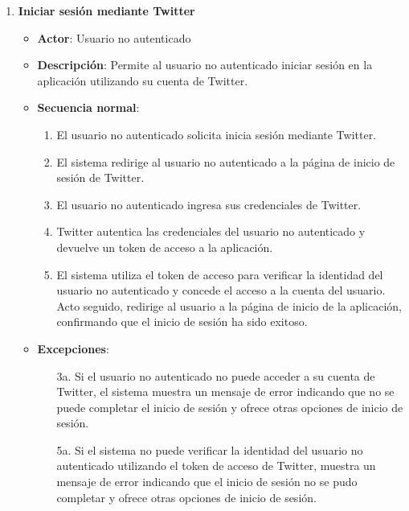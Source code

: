 \begin{enumerate}[label=UC-\protect\twodigits{\arabic*}:, align=left, leftmargin=*]
\item \textbf{Iniciar sesión mediante Twitter}
\begin{itemize}
\item \textbf{Actor}: Usuario no autenticado
\item \textbf{Descripción}: Permite al usuario no autenticado iniciar sesión en la aplicación utilizando su cuenta de Twitter.
\item \textbf{Secuencia normal}:
\begin{enumerate}[label={\arabic*}:]
\item El usuario no autenticado solicita inicia sesión mediante Twitter.
\item El sistema redirige al usuario no autenticado a la página de inicio de sesión de Twitter.
\item El usuario no autenticado ingresa sus credenciales de Twitter.
\item Twitter autentica las credenciales del usuario no autenticado y devuelve un token de acceso a la aplicación.
\item El sistema utiliza el token de acceso para verificar la identidad del usuario no autenticado y concede el acceso a la cuenta del usuario. Acto seguido, redirige al usuario a la página de inicio de la aplicación, confirmando que el inicio de sesión ha sido exitoso.
\end{enumerate}
\item \textbf{Excepciones}:
\begin{itemize}
\item[3a.] Si el usuario no autenticado no puede acceder a su cuenta de Twitter, el sistema muestra un mensaje de error indicando que no se puede completar el inicio de sesión y ofrece otras opciones de inicio de sesión.
\item[5a.] Si el sistema no puede verificar la identidad del usuario no autenticado utilizando el token de acceso de Twitter, muestra un mensaje de error indicando que el inicio de sesión no se pudo completar y ofrece otras opciones de inicio de sesión.
\end{itemize}
\end{itemize}


\end{enumerate}

